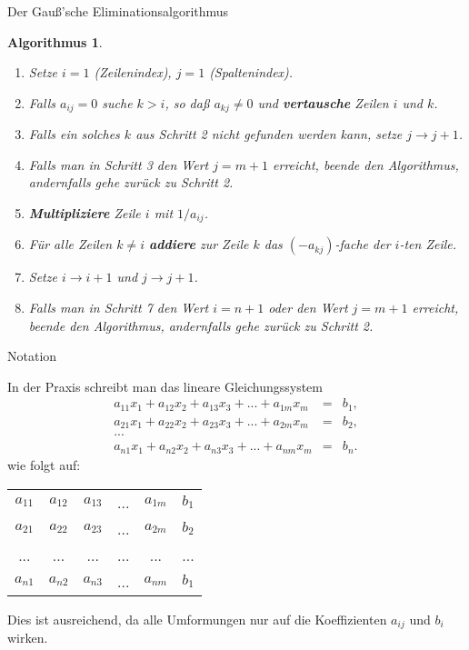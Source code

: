 \documentclass[german]{beamer}
\newcommand{\bq}{\begin{eqnarray*}}
\newcommand{\eq}{\end{eqnarray*}}
\newtheorem*{mytheorem11}{Algorithmus}
\begin{document}
\begin{frame}{Der Gau{\ss}'sche Eliminationsalgorithmus}

\begin{mytheorem11}
{\small
\begin{enumerate}
\item Setze $i=1$ (Zeilenindex), $j=1$ (Spaltenindex).
\item Falls $a_{ij}=0$ suche $k>i$, so da{\ss} $a_{kj}\neq 0$ und {\bf vertausche} Zeilen $i$ und $k$.
\item Falls ein solches $k$ aus Schritt 2 nicht gefunden werden kann, setze $j\rightarrow j+1$.
\item Falls man in Schritt 3 den Wert $j=m+1$ erreicht, beende den Algorithmus, andernfalls gehe zur\"uck zu
Schritt 2.
\item {\bf Multipliziere} Zeile $i$ mit $1/a_{ij}$.
\item F\"ur alle Zeilen $k\neq i$ {\bf addiere} zur Zeile $k$ das $(-a_{kj})$-fache der $i$-ten Zeile.
\item Setze $i \rightarrow i+1$ und $j \rightarrow j+1$.
\item Falls man in Schritt 7 den Wert $i=n+1$ oder den Wert $j=m+1$ erreicht, beende den Algorithmus,
andernfalls gehe zur\"uck zu Schritt 2.
\end{enumerate}
}
\end{mytheorem11}

\end{frame}

\begin{frame}{Notation}

In der Praxis schreibt man das lineare Gleichungssystem
{\small
\bq
 a_{11} x_1 + a_{12} x_2 + a_{13} x_3 + ... + a_{1m} x_m & = & b_1,
\nonumber \\
 a_{21} x_1 + a_{22} x_2 + a_{23} x_3 + ... + a_{2m} x_m & = & b_2,
\nonumber \\
 ... & & 
\nonumber \\
 a_{n1} x_1 + a_{n2} x_2 + a_{n3} x_3 + ... + a_{nm} x_m & = & b_n.
\eq
}
wie folgt auf:
\begin{center}
{\small
\begin{tabular}{ccccc|c}
$a_{11}$ & $a_{12}$ & $a_{13}$ & ... & $a_{1m}$ & $b_1$ \\
$a_{21}$ & $a_{22}$ & $a_{23}$ & ... & $a_{2m}$ & $b_2$ \\
...     & ...     & ...     & ... & ...     & ... \\
$a_{n1}$ & $a_{n2}$ & $a_{n3}$ & ... & $a_{nm}$ & $b_1$ \\
\end{tabular}
}
\end{center}
Dies ist ausreichend, da alle Umformungen nur auf die Koeffizienten $a_{ij}$ und $b_i$ wirken.

\end{frame}
\end{document}
